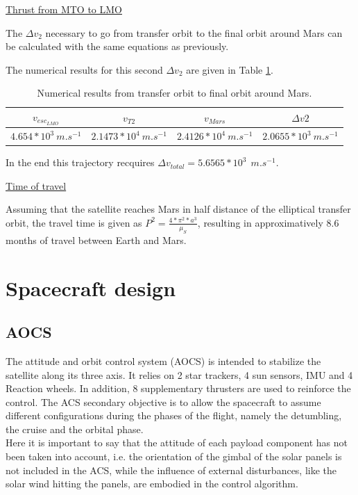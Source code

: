 \documentclass[a4paper, oneside, 11pt]{article}
\begin{document}
\underline{Thrust from MTO to LMO}

\medskip
\noindent The $\Delta v_2$ necessary to go from transfer orbit to the final orbit around Mars can be calculated with the same equations as previously. 

\noindent The numerical results for this second $\Delta v_2$ are given in Table \ref{deltaV2Tab}.

\begin{table}[!h]
 \caption{Numerical results from transfer orbit to final orbit around Mars.}
 \label{deltaV2Tab}
\centering
 \begin{tabular}{| c | c |c |c |}
  \hline
 $v_{esc_{LMO}}$ & $v_{T2}$ & $v_{Mars}$ &  $\Delta v2$  \\
     \hline
  $ 4.654*10^3 \SI{}{m.s^{-1}}$  & $ 2.1473*10^4 \SI{}{m.s^{-1}}$ & $ 2.4126*10^4 \SI{}{m.s^{-1}}$ & $ 2.0655*10^3 \SI{}{m.s^{-1}}$ \\
     \hline
\end{tabular}
\end{table}

\medskip

\noindent In the end this trajectory recquires $\Delta v_{total}= 5.6565 *10^3 \ \SI{}{m.s^{-1}}$.

\medskip

\underline{Time of travel}

\medskip

\noindent Assuming that the satellite  reaches Mars in half distance of the elliptical transfer orbit, the travel time is given as $P^2= \frac{4*\pi^2*a^3}{\mu_S}$, resulting in approximatively 8.6 months of travel between Earth and Mars.

\section{Spacecraft design}

\subsection{AOCS}

The attitude and orbit control system (AOCS) is intended to stabilize the satellite along its three axis. It relies on 2 star trackers, 4 sun sensors, IMU and 4 Reaction wheels. In addition, 8 supplementary thrusters are used to reinforce the control. The ACS secondary objective is to allow the spacecraft to assume different configurations during the phases of the flight, namely the detumbling, the cruise and the orbital phase. \\
Here it is important to say that the attitude of each payload component has not been taken into account, i.e. the orientation of the gimbal of the solar panels is not included in the ACS, while the influence of external disturbances, like the solar wind hitting the panels, are embodied in the control algorithm. \\
\end{document}
